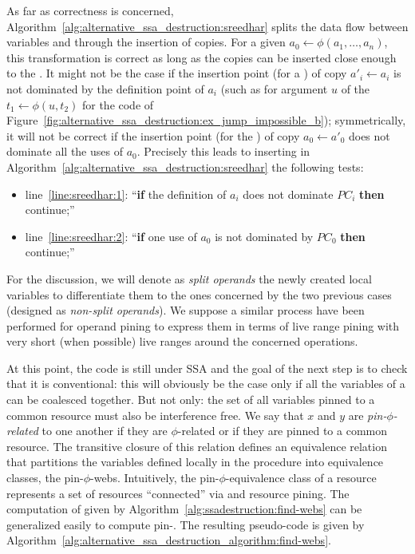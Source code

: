 As far as correctness is concerned, Algorithm~\ref{alg:alternative_ssa_destruction:sreedhar} splits the data flow between variables and \phinodes through the insertion of copies. 
For a given \phifun $a_0\gets \phi(a_1,\dots,a_n)$, this transformation is correct as long as the copies can be inserted close enough to the \phifun. 
It might not be the case if the insertion point (for a \useop) of copy $a'_i\gets a_i$ is not dominated by the definition point of $a_i$ (such as for argument $u$ of the \phifun $t_1\gets \phi(u,t_2)$ for the code of Figure~\ref{fig:alternative_ssa_destruction:ex_jump_impossible_b}); 
symmetrically, it will not be correct if the insertion point (for the ) of copy $a_0\gets a'_0$ does not dominate all the uses of $a_0$. 
Precisely this leads to inserting in Algorithm~\ref{alg:alternative_ssa_destruction:sreedhar} the following tests:
\begin{itemize}
\item line~\ref{line:sreedhar:1}: ``{\bf if} the definition of $a_i$ does not dominate $PC_i$ {\bf then} continue;''
\item line~\ref{line:sreedhar:2}: ``{\bf if} one use of $a_0$ is not dominated by $PC_0$ {\bf then} continue;''
\end{itemize}
For the discussion, we will denote as \emph{split operands} the newly created local variables to differentiate them to the ones concerned by the two previous cases (designed as \emph{non-split operands}).
We suppose a similar process have been performed for operand pining to express them in terms of live range pining with very short (when possible) live ranges around the concerned operations. 

At this point, the code is still under SSA and the goal of the next step is to check that it is conventional: 
this will obviously be the case only if all the variables of a \phiweb can be coalesced together. 
But not only: 
the set of all variables pinned to a common resource must also be interference free. 
We say that $x$ and $y$ are \emph{pin-$\phi$-related} to one another if they are $\phi$-related or if they are pinned to a common resource. 
The transitive closure of this relation defines an equivalence relation that partitions the variables defined locally in the procedure into equivalence classes, the pin-$\phi$-webs. 
Intuitively, the pin-$\phi$-equivalence class of a resource represents a set of resources ``connected'' via \phifuns and resource pining. 
The computation of \phiwebs given by Algorithm~\ref{alg:ssadestruction:find-webs} can be generalized easily to compute pin-\phiwebs. 
The resulting pseudo-code is given by Algorithm~\ref{alg:alternative_ssa_destruction_algorithm:find-webs}.

